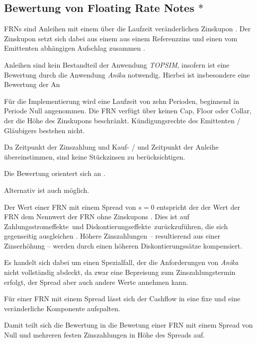 \documentclass[12pt, a4paper]{article}
\begin{document}
\subsection{Bewertung von Floating Rate Notes $\ast$}
\label{sec:bewertung_von_floating_rate_notes}
\glspl{FRN} sind Anleihen mit einem über die Laufzeit veränderlichen Zinskupon \autocite[][373]{fabozzi_handbook_2005}. Der Zinskupon setzt sich dabei aus einem aus einem Referenzzins und einen vom Emittenten abhängigen Aufschlag zusammen \autocite[][374]{fabozzi_handbook_2005}.

Anleihen sind kein Bestandteil der Anwendung \textit{TOPSIM}, insofern ist eine Bewertung durch die Anwendung \textit{Anika} notwendig.
Hierbei ist insbesondere eine Bewertung der An

Für die Implementierung wird eine Laufzeit von zehn Perioden, beginnend in Periode Null angenommen.
Die \gls{FRN} verfügt über keinen Cap, Floor oder Collar, der die Höhe des Zinskupons beschränkt.
Kündigungsrechte des Emittenten / Gläubigers bestehen nicht.

Da Zeitpunkt der Zinszahlung und Kauf- / und Zeitpunkt der Anleihe übereinstimmen, sind keine Stückzinsen zu berücksichtigen.

Die Bewertung orientert sich an \autocite[][]{veronesi_fixed_2010}.

Alternativ ist auch \autocite[][]{fabozzi_handbook_2005} möglich.

Der Wert einer \gls{FRN} mit einem Spread von $s=0$ entspricht der der Wert der \gls{FRN} dem Nennwert der \gls{FRN} ohne Zinskupons \autocite[][S.~52~f.]{veronesi_fixed_2010}. Dies ist auf \glqq Zahlungsstromeffekte\grqq~und \glqq Diskontierungseffekte\grqq~zurückzuführen, die sich gegenseitig ausgleichen \autocite[][S.~54]{veronesi_fixed_2010}. Höhere Zinszahlungen -- resultierend aus einer Zinserhöhung -- werden durch einen höheren Diskontierungssätze kompensiert.

Es handelt sich dabei um einen Spezialfall, der die Anforderungen von \textit{Anika} nicht vollständig abdeckt, da zwar eine Bepreisung zum Zinszahlungstermin erfolgt, der Spread aber auch andere Werte annehmen kann.

Für einer \gls{FRN} mit einem Spread lässt sich der Cashflow in eine fixe und eine veränderliche Komponente aufspalten.

Damit teilt sich die Bewertung in die Bewetung einer \gls{FRN} mit einem Spread von Null und mehreren festen Zinszahlungen in Höhe des Spreads auf.
\end{document}
